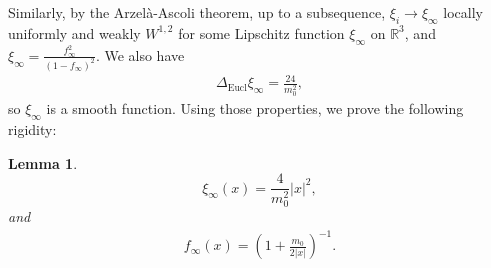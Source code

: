 \documentclass[letter]{amsart}
\newtheorem{lem}[thm]{Lemma}
\theoremstyle{definition}
\theoremstyle{remark}
\begin{document}
Similarly, by the Arzel\`{a}-Ascoli theorem, up to a subsequence, $\xi _i \to \xi _\infty$ locally uniformly and weakly $W^{1,2}$ for some Lipschitz function $\xi _\infty$ on $\mathbb{R}^3$, and $\xi _\infty = \frac{f_\infty^2}{(1-f_\infty)^2}$. We also have 
\begin{align}\label{xi-eq}
		\Delta _{\mathrm{Eucl} } \xi_\infty = \frac{24}{m_0^2},
	\end{align}
	so $\xi _\infty$ is a smooth function. 
Using those properties, we prove the following rigidity:
\begin{lem}\label{lem-rigidity}
$$
\xi _\infty(x) = \frac{4}{m_0^2}|x|^2,
$$ 
and
\begin{align}\label{f-infinity}
	f_\infty(x) = \left( 1 + \frac{m_0}{2|x|} \right) ^{-1}.
\end{align}
\end{lem}
\end{document}
